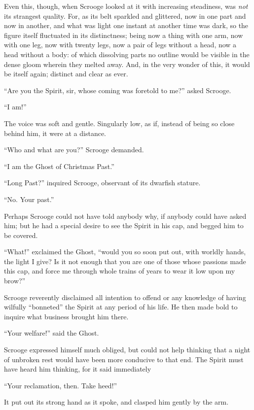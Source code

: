 \documentclass[paper=5.5in:8.5in,BCOR=5mm,twoside,DIV=calc,12pt,usegeometry]{scrbook} %
\begin{document}
Even this, though, when Scrooge looked at it with increasing steadiness, was \textit{not} its strangest quality. For, as its belt sparkled and glittered, now in one part and now in another, and what was light one instant at another time was dark, so the figure itself fluctuated in its distinctness; being now a thing with one arm, now with one leg, now with twenty legs, now a pair of legs without a head, now a head without a body: of which dissolving parts no outline would be visible in the dense gloom wherein they melted away. And, in the very wonder of this, it would be itself again; distinct and clear as ever.

\enquote{Are you the Spirit, sir, whose coming was foretold to me?} asked Scrooge.

\enquote{I am!}

The voice was soft and gentle. Singularly low, as if, instead of being so close behind him, it were at a distance.

\enquote{Who and what are you?} Scrooge demanded.

\enquote{I am the Ghost of Christmas Past.}

\enquote{Long Past?} inquired Scrooge, observant of its dwarfish stature.

\enquote{No. Your past.}

Perhaps Scrooge could not have told anybody why, if anybody could have asked him; but he had a special desire to see the Spirit in his cap, and begged him to be covered.

\enquote{What!} exclaimed the Ghost, \enquote{would you so soon put out, with worldly hands, the light I give? Is it not enough that you are one of those whose passions made this cap, and force me through whole trains of years to wear it low upon my brow?}

Scrooge reverently disclaimed all intention to offend or any knowledge of having wilfully \enquote{bonneted} the Spirit at any period of his life. He then made bold to inquire what business brought him there.

\enquote{Your welfare!} said the Ghost.

Scrooge expressed himself much obliged, but could not help thinking that a night of unbroken rest would have been more conducive to that end. The Spirit must have heard him thinking, for it said immediately\textemdash 

\enquote{Your reclamation, then. Take heed!}

It put out its strong hand as it spoke, and clasped him gently by the arm.
\end{document}
